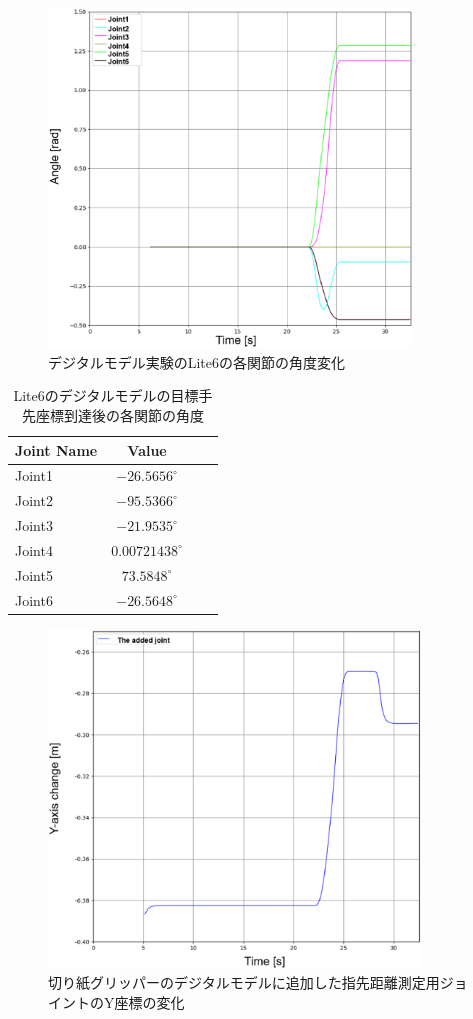 \begin{figure}[htbt]
    \centering
     \includegraphics[height=90mm]{expt_8_sim_joint_states.eps}
     \caption{デジタルモデル実験のLite6の各関節の角度変化}
     \label{fig:f2}
\end{figure}

\begin{table}[htb]
	\centering
	\caption{Lite6のデジタルモデルの目標手先座標到達後の各関節の角度}
	\begin{tabular}{lcrc} \hline
	Joint Name& Value     \\ \hline \hline
	Joint1    & $-26.5656^\circ$ \\
	Joint2    & $-95.5366^\circ$ \\
	Joint3    & $-21.9535^\circ$ \\
	Joint4    & $0.00721438^\circ$ \\
	Joint5    & $73.5848^\circ$ \\
    Joint6    & $-26.5648^\circ$ \\ \hline
	\end{tabular}
\end{table}


\begin{figure}[htbt]
	\centering
	 \includegraphics[height=90mm]{measure_joint_evi.eps}
	 \caption{切り紙グリッパーのデジタルモデルに追加した指先距離測定用ジョイントのY座標の変化}
	 \label{fig:f2}
\end{figure}

